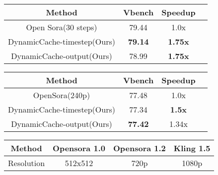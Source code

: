 \documentclass{article}
\begin{document}
\begin{table}[]
\begin{tabular}{cccc}
\toprule
Method               & Vbench         & Speedup                \\
\midrule
Open Sora(30 steps)  & 79.44          & 1.0x                    \\
DynamicCache-timestep(Ours) & \textbf{79.14} & \textbf{1.75x}                    \\
DynamicCache-output(Ours)   & 78.99 & \textbf{1.75x}  \\
\bottomrule
\end{tabular}
\end{table}


\begin{table}[]
\begin{tabular}{cccc}
\toprule
Method               & Vbench         & Speedup               \\
\midrule
OpenSora(240p)       & 77.48          & 1.0x                      \\
DynamicCache-timestep(Ours) & 77.34 & \textbf{1.5x}                    \\
DynamicCache-output(Ours)   & \textbf{77.42} & 1.34x & \\
\bottomrule
\end{tabular}
\end{table}


\begin{table}[]
\begin{tabular}{cccc}
\toprule
Method               & Opensora 1.0         & Opensora 1.2 & Kling 1.5                \\
\midrule
Resolution       & 512x512          & 720p  & 1080p                      \\

\bottomrule
\end{tabular}
\end{table}
\end{document}
